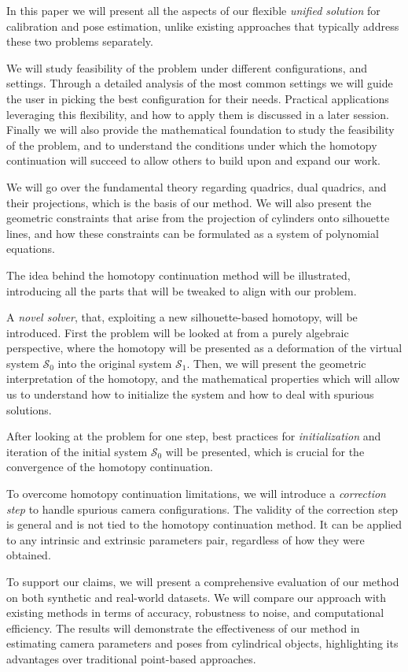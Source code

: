 In this paper we will present all the aspects of our flexible \emph{unified solution} for calibration and pose estimation, unlike existing approaches that typically address these two problems separately.

We will study feasibility of the problem under different configurations, and settings. Through a detailed analysis of the most common settings we will guide the user in picking the best configuration for their needs. Practical applications leveraging this flexibility, and how to apply them is discussed in a later session. Finally we will also provide the mathematical foundation to study the feasibility of the problem, and to understand the conditions under which the homotopy continuation will succeed to allow others to build upon and expand our work.

We will go over the fundamental theory regarding quadrics, dual quadrics, and their projections, which is the basis of our method. We will also present the geometric constraints that arise from the projection of cylinders onto silhouette lines, and how these constraints can be formulated as a system of polynomial equations.

The idea behind the homotopy continuation method will be illustrated, introducing all the parts that will be tweaked to align with our problem.

A \emph{novel solver}, that, exploiting a new silhouette-based homotopy, will be introduced. First the problem will be looked at from a purely algebraic perspective, where the homotopy will be presented as a deformation of the virtual system $\mathcal{S}_0$ into the original system $\mathcal{S}_1$. Then, we will present the geometric interpretation of the homotopy, and the mathematical properties which will allow us to understand how to initialize the system and how to deal with spurious solutions.

After looking at the problem for one step, best practices for \emph{initialization} and iteration of the initial system $\mathcal{S}_0$ will be presented, which is crucial for the convergence of the homotopy continuation.

To overcome homotopy continuation limitations, we will introduce a \emph{correction step} to handle spurious camera configurations. The validity of the correction step is general and is not tied to the homotopy continuation method. It can be applied to any intrinsic and extrinsic parameters pair, regardless of how they were obtained.

To support our claims, we will present a comprehensive evaluation of our method on both synthetic and real-world datasets. We will compare our approach with existing methods in terms of accuracy, robustness to noise, and computational efficiency. The results will demonstrate the effectiveness of our method in estimating camera parameters and poses from cylindrical objects, highlighting its advantages over traditional point-based approaches.

